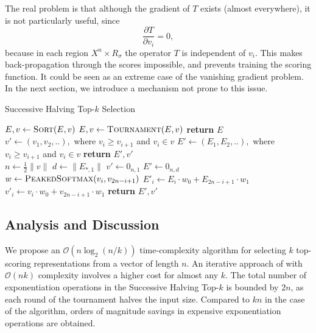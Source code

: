 \documentclass{article}
\begin{document}
The real problem is that although the gradient of \(T\) exists (almost everywhere), it is not particularly useful, since
\begin{equation}
  \frac{\partial T}{\partial v_{i}} = 0,
\end{equation}
because in each region \(X^{n}\times R_{\sigma}\) the operator \(T\) is independent of \(v_{i}\). This makes back-propagation through the scores impossible, and prevents training the scoring function. It could be seen as an extreme case of the vanishing gradient problem.
In the next section, we introduce a mechanism not prone to this issue.

\begin{algorithm}
    \caption{Successive Halving Top-$k$ Selection}
    \begin{algorithmic}[1]
    \State $E, v \gets \Call{Sort}{E, v}$
    \State $E, v \gets \Call{Tournament}{E, v}$
    \EndFor
    \State \textbf{return} $E$
    \EndProcedure\\
    
    
    \State $v' \gets (v_1,v_2,..), $ where $v_i \ge v_{i+1}$ and $v_i \in v$
    \State $E' \gets (E_1,E_2,..), $ where $v_i \ge v_{i+1}$ and $v_i \in v$ \State \textbf{return} $E', v'$
    \EndProcedure\\
    
    \State $n  \gets \frac{1}{2} \lVert v \rVert$ 
    \State $d  \gets \lVert E_{*,1} \rVert$ 
    \State $v' \gets 0_{n,1}$  
    \State $E' \gets 0_{n,d}$
        \State $w \gets \Call{PeakedSoftmax}{v_i, v_{2n-i+1}}$
\State $E'_i \gets E_i \cdot w_0 + E_{2n-i+1} \cdot w_1$
        \State $v'_i \gets v_i \cdot w_0 + v_{2n-i+1} \cdot w_1$
    \EndFor
    \State \textbf{return} $E', v'$
    \EndProcedure
    \end{algorithmic}
    \label{algo-soft-topk}
\end{algorithm}


\subsection{Analysis and Discussion}
We propose an $\mathcal{O}(n\log_2(n/k))$ time-complexity algorithm for selecting $k$ top-scoring representations from a vector of length $n$. An iterative approach of \citet{goyal2017continuous} with $\mathcal{O}(nk)$ complexity involves a higher cost for almost any $k$. The total number of exponentiation operations in the Successive Halving Top-$k$ is bounded by $2n$, as each round of the tournament halves the input size. Compared to $kn$ in the case of the \citet{goyal2017continuous} algorithm, orders of magnitude savings in expensive exponentiation operations are obtained. 
\end{document}
